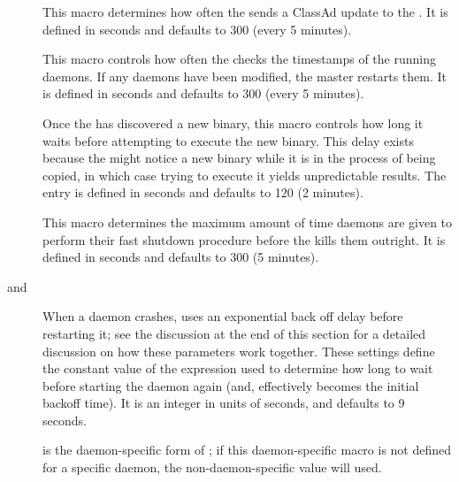 \begin{description}
\item[]
  \label{param:MasterUpdateInterval} This macro determines how often
  the  sends a ClassAd update to the
  .  It is defined in seconds and defaults to 300
  (every 5 minutes).
  
\item[]
  \label{param:MasterCheckNewExecInterval} This
  macro controls how often the  checks the timestamps
  of the running daemons.  If any daemons have been modified, the
  master restarts them.  It is defined in seconds and defaults to 300
  (every 5 minutes).

\item[]
  \label{param:MasterNewBinaryDelay} Once the  has
  discovered a new binary, this macro controls how long it waits
  before attempting to execute the new binary.  This delay exists
  because the  might notice a new binary while it
  is in the process of being copied,
  in which case trying to execute it yields
  unpredictable results.  The entry is defined in seconds and
  defaults to 120 (2 minutes).

\item[]
  \label{param:ShutdownFastTimeout} This macro determines the maximum
  amount of time daemons are given to perform their
  fast shutdown procedure before the  kills them
  outright.  It is defined in seconds and defaults to 300 (5 minutes).

\item[ and
  ]
  \label{param:MasterBackoffConstant}
  When a daemon crashes,  uses an exponential back off
  delay before restarting it; see the discussion at the end of this
  section for a detailed discussion on how these parameters work together.
  These settings define the constant value of the expression used to
  determine how long to wait before starting the daemon again (and,
  effectively becomes the initial backoff time).  It is an integer in
  units of seconds, and defaults to 9 seconds.

   is the daemon-specific
  form of ; if this daemon-specific
  macro is not defined for a specific daemon, the non-daemon-specific
  value will used.


\end{description}
